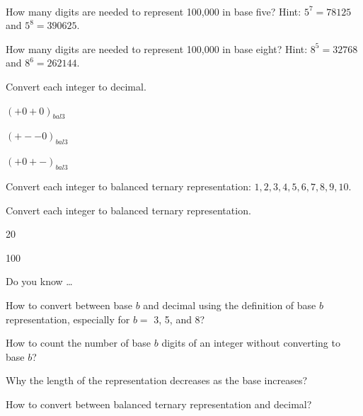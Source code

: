 \begin{exer}[\exerU] %
\label{exer_count_digits_100000_baseb}
~
    \begin{exerpart}
        \item How many digits are needed to represent 100,000 in base five?  Hint: $5^7 = 78125$ and $5^8=390625$.
        \item How many digits are needed to represent 100,000 in base eight? Hint: $8^5=32768$ and $8^6=262144$.
    \end{exerpart}
\end{exer}

\begin{exer}[\exerU] %
\label{exer_conv_from_bal3}  
        Convert each integer to decimal.  
        \begin{exerpart}
            \item $(+0+0)_{bal3}$
            \item $(+--0)_{bal3}$
            \item $(+0+-)_{bal3}$
       \end{exerpart}
\end{exer}

\begin{exer}[\exerU] %
\label{exer_conv_to_bal3_1to10}  
    Convert each integer to balanced ternary representation: $1, 2, 3, 4, 5, 6, 7, 8, 9, 10$. 
\end{exer}

\begin{exer}[\exerU] %
\label{exer_conv_to_bal3_larger}  
    Convert each integer to balanced ternary representation. 
        \begin{exerpart}
            \item 20  
            \item 100 
       \end{exerpart}
\end{exer}

\begin{exer}[\exerR] %
\label{exer_dyk_base_rep}
    Do you know \ldots
        \begin{exerpart}
            \item How to convert between base $b$ and decimal using the definition of base $b$ representation, especially for $b=$ 3, 5, and 8?
            \item How to count the number of base $b$ digits of an integer without converting to base $b$?
            \item Why the length of the representation decreases as the base increases?
            \item How to convert between balanced ternary representation and decimal? 
        \end{exerpart}
\end{exer}

